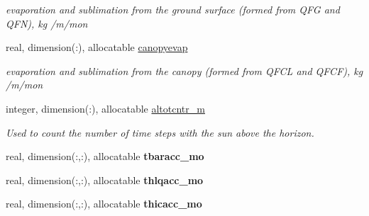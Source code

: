 \begin{DoxyCompactItemize}
\begin{DoxyCompactList}\small\item\em evaporation and sublimation from the ground surface (formed from Q\+F\+G and Q\+F\+N), kg /m/mon \end{DoxyCompactList}\item 
\hypertarget{structctem__statevars_1_1class__moyr__output_a6406b3c2568aedf068359ad0ed587cdc}{}real, dimension(\+:), allocatable \hyperlink{structctem__statevars_1_1class__moyr__output_a6406b3c2568aedf068359ad0ed587cdc}{canopyevap}\label{structctem__statevars_1_1class__moyr__output_a6406b3c2568aedf068359ad0ed587cdc}

\begin{DoxyCompactList}\small\item\em evaporation and sublimation from the canopy (formed from Q\+F\+C\+L and Q\+F\+C\+F), kg /m/mon \end{DoxyCompactList}\item 
\hypertarget{structctem__statevars_1_1class__moyr__output_ae637bc6e61ea15312732519599412ea7}{}integer, dimension(\+:), allocatable \hyperlink{structctem__statevars_1_1class__moyr__output_ae637bc6e61ea15312732519599412ea7}{altotcntr\+\_\+m}\label{structctem__statevars_1_1class__moyr__output_ae637bc6e61ea15312732519599412ea7}

\begin{DoxyCompactList}\small\item\em Used to count the number of time steps with the sun above the horizon. \end{DoxyCompactList}\item 
\hypertarget{structctem__statevars_1_1class__moyr__output_a4f023d1f461d356c4aca23443274d7b7}{}real, dimension(\+:,\+:), allocatable {\bfseries tbaracc\+\_\+mo}\label{structctem__statevars_1_1class__moyr__output_a4f023d1f461d356c4aca23443274d7b7}

\item 
\hypertarget{structctem__statevars_1_1class__moyr__output_a9fc3d7b08b9ff54a222b232d145bd949}{}real, dimension(\+:,\+:), allocatable {\bfseries thlqacc\+\_\+mo}\label{structctem__statevars_1_1class__moyr__output_a9fc3d7b08b9ff54a222b232d145bd949}

\item 
\hypertarget{structctem__statevars_1_1class__moyr__output_a08f56a953b880196445c2fdfa417d093}{}real, dimension(\+:,\+:), allocatable {\bfseries thicacc\+\_\+mo}\label{structctem__statevars_1_1class__moyr__output_a08f56a953b880196445c2fdfa417d093}


\end{DoxyCompactItemize}
